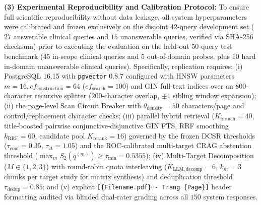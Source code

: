 \documentclass[10pt]{SPIIRAS_Proceedings}
\begin{document}
\textbf{(3) Experimental Reproducibility and Calibration Protocol:} To ensure full scientific reproducibility without data leakage, all system hyperparameters were calibrated and frozen exclusively on the disjoint 42-query development set ($27$ answerable clinical queries and $15$ unanswerable queries, verified via SHA-256 checksum) prior to executing the evaluation on the held-out 50-query test benchmark ($45$ in-scope clinical queries and $5$ out-of-domain probes, plus $10$ hard in-domain unanswerable clinical queries). Specifically, replication requires: (i) PostgreSQL 16.15 with \texttt{pgvector} 0.8.7 configured with HNSW parameters $m = 16, ef_{\mathrm{construction}} = 64$ ($ef_{\mathrm{search}} = 100$) and GIN full-text indices over an 800-character recursive splitter ($200$-character overlap, $\pm 1$ sibling window expansion); (ii) the page-level Scan Circuit Breaker with $\theta_{\mathrm{density}} = 50$ characters/page and control/replacement character checks; (iii) parallel hybrid retrieval ($K_{\mathrm{branch}} = 40$, title-boosted pairwise conjunctive-disjunctive GIN FTS, RRF smoothing $k_{\mathrm{RRF}} = 60$, candidate pool $K_{\mathrm{rerank}} = 16$) governed by the frozen DCSR thresholds ($\tau_{\mathrm{conf}} = 0.35$, $\tau_{\Delta} = 1.05$) and the ROC-calibrated multi-target CRAG abstention threshold ($\max_m S_2(q^{(m)}) \ge \tau_{\min} = 0.5355$); (iv) Multi-Target Decomposition ($M \in \{1, 2, 3\}$) with round-robin quota interleaving ($K_{\mathrm{LLM, decomp}} = 6$, $k_m = 3$ chunks per target study for matrix synthesis) and deduplication threshold $\tau_{\mathrm{dedup}} = 0.85$; and (v) explicit \texttt{[\{Filename.pdf\} - Trang \{Page\}]} header formatting audited via blinded dual-rater grading across all $150$ system responses.
\end{document}

